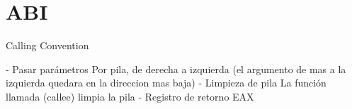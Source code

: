 \section{ABI}

Calling Convention

- Pasar parámetros	Por pila, de derecha a izquierda (el argumento de mas a la izquierda quedara en la direccion mas baja)
- Limpieza de pila	La función llamada (callee) limpia la pila
- Registro de retorno	EAX